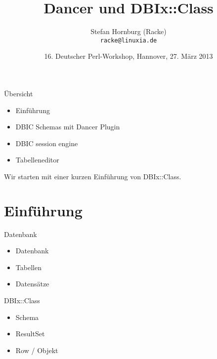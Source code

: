 \usepackage[utf8]{inputenc}
\usepackage[T1]{fontenc}
\usepackage{mathptmx}
\usepackage[scaled=.90]{helvet}
\usepackage{courier}
\usepackage{caption}
\captionsetup{labelformat=empty,labelsep=none}
\usepackage{verbatim}
\usepackage{hyperref}
\usepackage{listings}
\lstset{language=Perl,basicstyle=\normalsize,tabsize=3,showstringspaces=false}

\title{Dancer und DBIx::Class}
\author[racke]{Stefan Hornburg (Racke)\\ \texttt{racke@linuxia.de}}
\date{16. Deutscher Perl-Workshop, Hannover, 27. März 2013}


\maketitle{}

\begin{frame}
  \titlepage
\end{frame}

\tableofcontents

\begin{frame}{Übersicht}
\begin{itemize}
\item Einführung
\item DBIC Schemas mit Dancer Plugin
\item DBIC session engine
\item Tabelleneditor
\end{itemize}
\end{frame}

Wir starten mit einer kurzen Einführung von DBIx::Class.

\section{Einführung}
\begin{frame}{Datenbank}
\begin{itemize}
\item Datenbank
\item Tabellen
\item Datensätze
\end{itemize}
\end{frame}

\begin{frame}{DBIx::Class}
\begin{itemize}
\item Schema
\item ResultSet
\item Row / Objekt
\end{itemize}
\end{frame}

